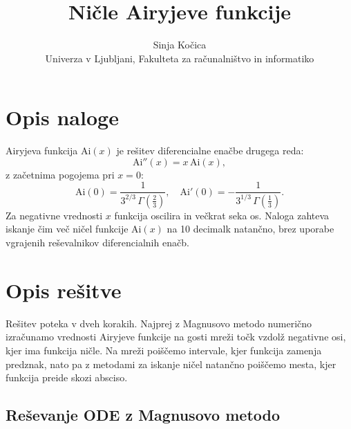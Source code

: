 \documentclass[a4paper, twocolumn]{article}
\title{\textbf{Ničle Airyjeve funkcije}}
\author{Sinja Kočica\\
\small Univerza v Ljubljani, Fakulteta za računalništvo in informatiko}
\date{}
\begin{document}
\maketitle

\section{Opis naloge}

Airyjeva funkcija $\mathrm{Ai}(x)$ je rešitev diferencialne enačbe drugega reda:
\[
\mathrm{Ai}''(x) = x\,\mathrm{Ai}(x),
\]
z začetnima pogojema pri $x = 0$:
\[
\mathrm{Ai}(0) = \frac{1}{3^{2/3}\,\Gamma\!\left(\tfrac{2}{3}\right)}, \quad
\mathrm{Ai}'(0) = -\frac{1}{3^{1/3}\,\Gamma\!\left(\tfrac{1}{3}\right)}.
\]
Za negativne vrednosti $x$ funkcija oscilira in večkrat seka os. Naloga zahteva iskanje čim več ničel funkcije $\mathrm{Ai}(x)$ na 10 decimalk natančno, brez uporabe vgrajenih reševalnikov diferencialnih enačb.

\section{Opis rešitve}

Rešitev poteka v dveh korakih. Najprej z Magnusovo metodo numerično izračunamo vrednosti Airyjeve funkcije na gosti mreži točk vzdolž negativne osi, kjer ima funkcija ničle. Na mreži poiščemo intervale, kjer funkcija zamenja predznak, nato pa z metodami za iskanje ničel natančno poiščemo mesta, kjer funkcija preide skozi absciso.

\subsection{Reševanje ODE z Magnusovo metodo}
\end{document}
